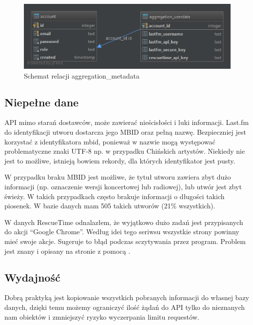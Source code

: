 \documentclass[brudnopis]{xmgr}
\begin{document}
        \begin{figure}
        	\includegraphics[width=\linewidth]{fig/db-aggregation-metadata.png}
        	\caption{Schemat relacji aggregation\_metadata}
        	\label{fig:}
        \end{figure}

        \subsection*{Niepełne dane}
        API mimo starań dostawców, może zawierać nieścisłości i luki informacji.
        Last.fm do identyfikacji utworu dostarcza jego MBID oraz pełną nazwę.
        Bezpieczniej jest korzystać z identyfikatora mbid, ponieważ w nazwie mogą występować problematyczne znaki UTF-8 np. w przypadku Chińskich artystów.
        Niekiedy nie jest to możliwe, istnieją bowiem rekordy, dla których identyfikator jest pusty.

        W przypadku braku MBID jest możliwe,
        że tytuł utworu zawiera zbyt dużo informacji (np. oznaczenie wersji koncertowej lub radiowej),
        lub utwór jest zbyt świeży. W takich przypadkach często brakuje informacji o długości takich piosenek.
        W bazie danych mam 505 takich utworów (21\% wszystkich).

        W danych RescueTime odnalazłem, że wyjątkowo dużo zadań jest przypisanych do akcji ``Google Chrome''.
        Według idei tego seriwsu wszystkie strony powinny mieć swoje akcje. Sugeruje to błąd podczas sczytywania przez program.
        Problem jest znany i opisany na stronie z pomocą \cite{rescuetime:help-browser-time}.

        \subsection*{Wydajność}
        Dobrą praktyką jest kopiowanie wszystkich pobranych informacji do własnej bazy danych,
        dzięki temu możemy ograniczyć ilość żądań do API tylko do nieznanych nam obiektów i zmniejszyć ryzyko wyczerpania limitu requestów.
\end{document}
